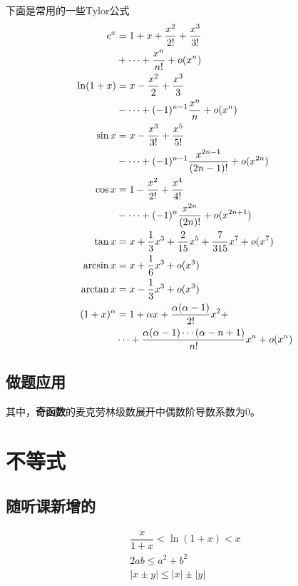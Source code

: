 下面是常用的一些Tylor公式
\begin{align}
	\notag e^x&=1+x+\frac{x^2}{2!}+\frac{x^3}{3!} \\ &+\cdots+\frac{x^n}{n!}+o(x^n)\\
	\notag \ln(1+x)&=x-\frac{x^2}{2}+\frac{x^3}{3}\\ &-\cdots+(-1)^{n-1}\frac{x^n}{n}+o(x^n)\\
	\notag \sin x&=x-\frac{x^3}{3!}+\frac{x^5}{5!}\\ &-\cdots+(-1)^{n-1}\frac{x^{2n-1}}{(2n-1)!}+o(x^{2n})\\
	\notag \cos x&=1-\frac{x^2}{2!}+\frac{x^4}{4!}\\ &-\cdots+(-1)^n\frac{x^{2n}}{(2n)!}+o(x^{2n+1})\\
           \tan x&=x+\frac{1}{3}x^3 + \frac{2}{15}x^5 + \frac{7}{315}x^7 + o(x^7)\\
           \arcsin x&= x + \frac{1}{6} x^3 + o(x^3) \\
           \arctan x&= x - \frac{1}{3} x^3 + o(x^3) \\
	\notag (1+x)^\alpha&=1+\alpha x+\frac{\alpha(\alpha-1)}{2!}x^2+ \\  &\cdots+\frac{\alpha(\alpha-1)\cdots(\alpha-n+1)}{n!}x^n+o(x^n)
\end{align}

\subsection{做题应用} \label{tylor-app}

其中，\textbf{奇函数}的麦克劳林级数展开中偶数阶导数系数为0。

\section{不等式} \label{inequlity}

\subsection{随听课新增的}

\begin{lemma}
    \begin{gather*}
        \dfrac{x}{1+x} < \ln (1+x) < x \\
        2ab \leq a^2 + b^2 \\
        |x\pm y| \leq |x| \pm |y|
    \end{gather*}
\end{lemma}



